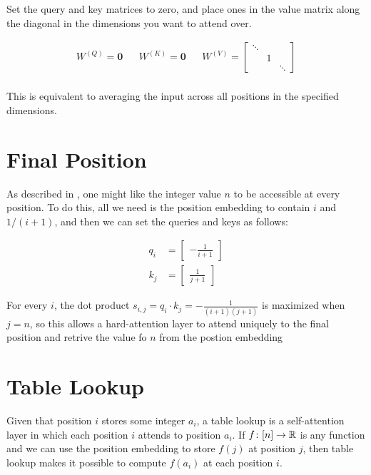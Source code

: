 Set the query and key matrices to zero, and place ones in the value matrix along the diagonal in the dimensions you want to attend over.

\begin{align*}
  W^{(Q)}=\textbf{0}
  &&
  W^{(K)}=\textbf{0}
  &&
  W^{(V)}=\begin{bmatrix}
    \ddots & & \\
    & 1 & \\
    & & \ddots
  \end{bmatrix}\\
\end{align*}

This is equivalent to averaging the input across all positions in the specified dimensions.

\section{Final Position}
\label{sec:attn_final_position}

As described in \citet{barcelo-etal-2024-logical}, one might like the integer value $n$ to be accessible at every position. To do this, all we need is the position embedding to contain $i$ and $1/(i+1)$, and then we can set the queries and keys as follows:

\begin{align*}
  q_i &= \begin{bmatrix} -\frac{1}{i+1} \end{bmatrix} \\
  k_j &= \begin{bmatrix} \frac{1}{j+1} \end{bmatrix}
\end{align*}

For every $i$, the dot product $s_{i,j} = q_i \cdot k_j = -\frac{1}{(i+1)(j+1)}$ is maximized when $j=n$, so this allows a hard-attention layer to attend uniquely to the final position and retrive the value fo $n$ from the postion embedding

\section{Table Lookup}

Given that position $i$ stores some integer $a_i$, a table lookup is a self-attention layer in which each position $i$ attends to position $a_i$.
If $f \colon [n] \to \mathbb{R}$ is any function and we can use the position embedding to store $f(j)$ at position $j$, then table lookup makes it possible to compute $f(a_i)$ at each position $i$.

